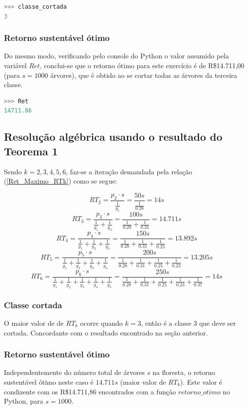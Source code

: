 \documentclass[a4paper, 12pt]{article}
\begin{document}
\begin{lstlisting}[language=Python, caption=Valor da variável \emph{classe\_cortada}, label=listing_console_classe_cortada]
>>> classe_cortada
3
\end{lstlisting}


\subsubsection{Retorno sustentável ótimo}

Do mesmo modo, verificando pelo console do Python o valor assumido pela variável $Ret$, conclui-se que o retorno ótimo para este exercício é de R\$14.711,00 (para $s=1000$ árvores), que é obtido ao se cortar todas as árvores da terceira classe.
\begin{lstlisting}[language=Python, caption=Valor da variável \emph{Ret}, label=listing_console_Ret]
>>> Ret
14711.86
\end{lstlisting}

\subsection{Resolução algébrica usando o resultado do Teorema 1}

Sendo $k = 2, 3, 4, 5, 6$, faz-se a iteração demandada pela relação (\ref{Ret_Maximo_RTk}) como se segue:

$$RT_2=\frac{p_2\cdot s}{\frac{1}{g_1}}=\frac{50s}{\frac{1}{0.28}}=14s$$
$$RT_3=\frac{p_3\cdot s}{\frac{1}{g_1}+\frac{1}{g_2}}=\frac{100s}{\frac{1}{0.28}+\frac{1}{0.31}}=14.711s$$
$$RT_4=\frac{p_4\cdot s}{\frac{1}{g_1}+\frac{1}{g_2}+\frac{1}{g_3}}=\frac{150s}{\frac{1}{0.28}+\frac{1}{0.31}+\frac{1}{0.25}}=13.892s$$
$$RT_5=\frac{p_5\cdot s}{\frac{1}{g_1}+\frac{1}{g_2}+\frac{1}{g_3}+\frac{1}{g_4}}=\frac{200s}{\frac{1}{0.28}+\frac{1}{0.31}+\frac{1}{0.25}+\frac{1}{0.23}}=13.205s$$
$$RT_6=\frac{p_6\cdot s}{\frac{1}{g_1}+\frac{1}{g_2}+\frac{1}{g_3}+\frac{1}{g_4}+\frac{1}{g_5}}=\frac{250s}{\frac{1}{0.28}+\frac{1}{0.31}+\frac{1}{0.25}+\frac{1}{0.23}+\frac{1}{0.37}}=14s$$

\subsubsection{Classe cortada}
 O maior valor de de $RT_k$ ocorre quando $k=3$, então é a classe 3 que deve ser cortada. Concordante com o resultado encontrado na seção anterior.
\subsubsection{Retorno sustentável ótimo}
Independentemente do número total de árvores $s$ na floresta, o retorno sustentável ótimo neste caso é $14.711s$ (maior valor de $RT_k$). Este valor é condizente com os R\$14.711,86 encontrados com a função $retorno\_otimo$ no Python, para $s=1000$.
\end{document}

